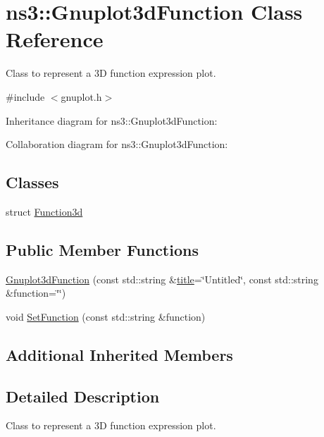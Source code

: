 \hypertarget{classns3_1_1Gnuplot3dFunction}{}\section{ns3\+:\+:Gnuplot3d\+Function Class Reference}
\label{classns3_1_1Gnuplot3dFunction}


Class to represent a 3D function expression plot.  




{\ttfamily \#include $<$gnuplot.\+h$>$}



Inheritance diagram for ns3\+:\+:Gnuplot3d\+Function\+:


Collaboration diagram for ns3\+:\+:Gnuplot3d\+Function\+:
\subsection*{Classes}
\begin{DoxyCompactItemize}
\item 
struct \hyperlink{structns3_1_1Gnuplot3dFunction_1_1Function3d}{Function3d}
\end{DoxyCompactItemize}
\subsection*{Public Member Functions}
\begin{DoxyCompactItemize}
\item 
\hyperlink{classns3_1_1Gnuplot3dFunction_a25b2eacbea0deb0af764eb7b6ffc873c}{Gnuplot3d\+Function} (const std\+::string \&\hyperlink{lte__link__budget__x2__handover__measures_8m_a3f4b991df405379f6917e1683ed5a8c8}{title}=\char`\"{}Untitled\char`\"{}, const std\+::string \&function=\char`\"{}\char`\"{})
\item 
void \hyperlink{classns3_1_1Gnuplot3dFunction_a9f05179313d8f60a5cf962c3542707fb}{Set\+Function} (const std\+::string \&function)
\end{DoxyCompactItemize}
\subsection*{Additional Inherited Members}


\subsection{Detailed Description}
Class to represent a 3D function expression plot. 

